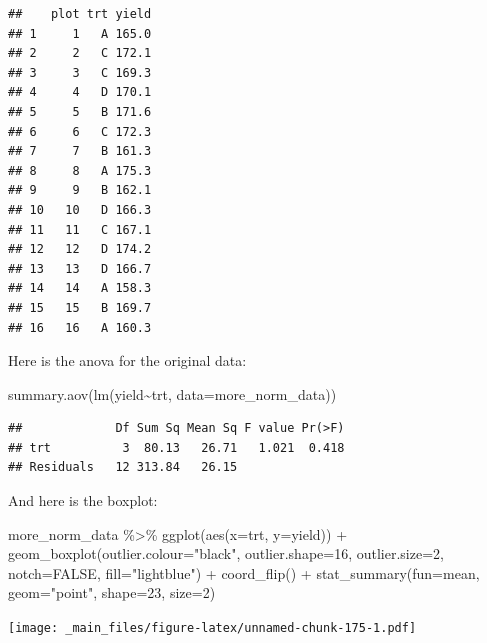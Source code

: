 \documentclass[
]{book}
\newenvironment{Shaded}{\begin{snugshade}}{\end{snugshade}}
\newcommand{\AttributeTok}[1]{\textcolor[rgb]{0.77,0.63,0.00}{#1}}
\newcommand{\ConstantTok}[1]{\textcolor[rgb]{0.00,0.00,0.00}{#1}}
\newcommand{\DecValTok}[1]{\textcolor[rgb]{0.00,0.00,0.81}{#1}}
\newcommand{\FunctionTok}[1]{\textcolor[rgb]{0.00,0.00,0.00}{#1}}
\newcommand{\NormalTok}[1]{#1}
\newcommand{\SpecialCharTok}[1]{\textcolor[rgb]{0.00,0.00,0.00}{#1}}
\newcommand{\StringTok}[1]{\textcolor[rgb]{0.31,0.60,0.02}{#1}}
\begin{document}
\begin{verbatim}
##    plot trt yield
## 1     1   A 165.0
## 2     2   C 172.1
## 3     3   C 169.3
## 4     4   D 170.1
## 5     5   B 171.6
## 6     6   C 172.3
## 7     7   B 161.3
## 8     8   A 175.3
## 9     9   B 162.1
## 10   10   D 166.3
## 11   11   C 167.1
## 12   12   D 174.2
## 13   13   D 166.7
## 14   14   A 158.3
## 15   15   B 169.7
## 16   16   A 160.3
\end{verbatim}

Here is the anova for the original data:

\begin{Shaded}
\begin{Highlighting}[]
\FunctionTok{summary.aov}\NormalTok{(}\FunctionTok{lm}\NormalTok{(yield}\SpecialCharTok{\textasciitilde{}}\NormalTok{trt, }\AttributeTok{data=}\NormalTok{more\_norm\_data))}
\end{Highlighting}
\end{Shaded}

\begin{verbatim}
##             Df Sum Sq Mean Sq F value Pr(>F)
## trt          3  80.13   26.71   1.021  0.418
## Residuals   12 313.84   26.15
\end{verbatim}

And here is the boxplot:

\begin{Shaded}
\begin{Highlighting}[]
\NormalTok{more\_norm\_data }\SpecialCharTok{\%\textgreater{}\%}
        \FunctionTok{ggplot}\NormalTok{(}\FunctionTok{aes}\NormalTok{(}\AttributeTok{x=}\NormalTok{trt, }\AttributeTok{y=}\NormalTok{yield)) }\SpecialCharTok{+} 
        \FunctionTok{geom\_boxplot}\NormalTok{(}\AttributeTok{outlier.colour=}\StringTok{"black"}\NormalTok{, }\AttributeTok{outlier.shape=}\DecValTok{16}\NormalTok{,}
             \AttributeTok{outlier.size=}\DecValTok{2}\NormalTok{, }\AttributeTok{notch=}\ConstantTok{FALSE}\NormalTok{, }\AttributeTok{fill=}\StringTok{"lightblue"}\NormalTok{) }\SpecialCharTok{+}
        \FunctionTok{coord\_flip}\NormalTok{() }\SpecialCharTok{+}
        \FunctionTok{stat\_summary}\NormalTok{(}\AttributeTok{fun=}\NormalTok{mean, }\AttributeTok{geom=}\StringTok{"point"}\NormalTok{, }\AttributeTok{shape=}\DecValTok{23}\NormalTok{, }\AttributeTok{size=}\DecValTok{2}\NormalTok{)}
\end{Highlighting}
\end{Shaded}

\texttt{[image: \_main\_files/figure-latex/unnamed-chunk-175-1.pdf]}
\end{document}
